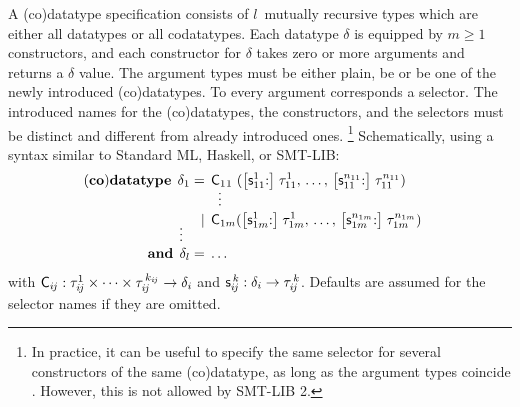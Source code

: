 \documentclass[a4paper,oribibl,envcountsame,draft]{llncs}
\newcommand\keyw[1]{\textbf{#1}}
\newcommand\const[1]{\textsf{#1}}
\newcommand\negvthinspace{\kern-0.083333em}
\begin{document}
A (co)datatype specification consists of $l$~mutually recursive types which are
either all datatypes or all codatatypes. Each datatype $\delta$ is equipped by
$m \ge 1$ constructors, and each constructor for $\delta$ takes zero or more
arguments and returns a $\delta$ value. The argument types must be either
plain, be or be one of the newly introduced (co)datatypes. To every
argument corresponds a selector. The introduced names for the (co)datatypes, the
constructors, and the selectors must be distinct and different from already
introduced ones.%
\footnote{In practice, it can be useful to specify the same selector
for several constructors of the same (co)datatype,
as long as the argument types coincide \cite[Section~3]{blanchette-et-al-2014-codata}.
However, this is not allowed by SMT-LIB 2.}
Schematically, using a syntax similar to Standard ML, Haskell,
or SMT-LIB:
%
\[
\begin{aligned}[t]
(\keyw{co})\keyw{datatype}\;\,
  \delta_1 & {}=\, \const{C}_{1}\rlap{${}_{1}$}\phantom{{}_{m}}(\bigl[\const{s}_{11}^1{:}\bigr]\; \tau_{11}^1, \,\ldots,\, \bigl[\const{s}_{11}^{n_{11}}{:}\bigr]\; \tau_{11}^{n_{11}}) & \\
           & {}\;\phantom{=\,}\;{} \smash{\,\,\,\vdots} \\[-\jot] %
           & {}\;\phantom{=\,}\llap{\ensuremath{\,\mid\,}}\; \const{C}_{1m}(\bigl[\const{s}_{1m}^1{:}\bigr]\; \tau_{1m}^1, \,\ldots,\, \big[\const{s}_{1m}^{n_{1m}}{:}\big]\; \tau_{1m}^{n_{1m}}) \\[-1\jot]
   \smash{\vdots\,\,\,} \\[-1\jot]
  \keyw{and}\; \,\delta_l & =\, \ldots
\end{aligned}
\]
%
with
$\const{C}_{i\negvthinspace j} : \tau_{i\negvthinspace j}^1\times\cdots\times\tau_{i\negvthinspace j}^{\,k_{\smash{i\negvthinspace j}}} \to \delta_i$
and $\const{s}_{i\negvthinspace j}^{\,k} : \delta_i \to \tau_{i\negvthinspace j}^{\,k}$. Defaults are assumed for
the selector names if they are omitted.
\end{document}
